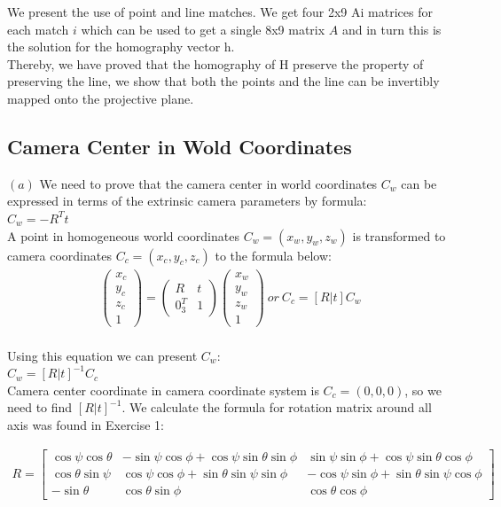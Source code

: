\documentclass[a4paper, twoside, english]{article}
\begin{document}
We present the use of point and line matches. We get four 2x9 Ai matrices for each match $i$ which can be used to get a single 8x9 matrix $A$ and in turn this is the solution for the homography vector h.\\
Thereby, we have proved that the homography of H preserve the property of preserving the line, we show that both the points and the line can be invertibly mapped onto the projective plane.

\subsection{ Camera Center in Wold Coordinates}
$(a)$ We need to prove that the camera center in world coordinates $C_w$ can be expressed in terms of the extrinsic camera parameters by formula:\\
$C_w = -R^Tt$\\
A point in homogeneous world coordinates $C_w=(x_w,y_w,z_w)$ is transformed to camera coordinates $C_c=(x_c,y_c,z_c)$ to the formula below:\\
\begin{equation}
	\begin{gathered}
	\left(
	\begin{array}{ccc}
		x_c\\
		y_c\\
		z_c\\
		1
	\end{array}
	\right) =
	\left(
	\begin{array}{ccc}
		R & t\\
		0_{3}^T & 1
	\end{array}
	\right)
	\left(
	\begin{array}{ccc}
		x_w\\
		y_w\\
		z_w\\
		1
	\end{array}
	\right) \
	or\  C_c = [R| t]C_w\\
	\label{eq:matrixCW}
	\end{gathered}
\end{equation}

Using this equation we can present $C_w$:\\
$ C_w = [R| t]^{-1}C_c$\\
Camera center coordinate in camera coordinate system is $C_c=(0,0,0)$, so we need to find $[R| t]^{-1}$.
We calculate the formula for rotation matrix around all axis was found in Exercise 1:

\begin{equation*}
\begin{gathered}
	R= \left[
	\begin{array}{ccc}
		\cos\psi\cos\theta & -\sin\psi\cos\phi+\cos\psi\sin\theta\sin\phi & \sin\psi\sin\phi+\cos\psi\sin\theta\cos\phi\\
		\cos\theta\sin\psi & \cos\psi\cos\phi+\sin\theta\sin\psi\sin\phi  & -\cos\psi\sin\phi+\sin\theta\sin\psi\cos\phi\\
		-\sin\theta & \cos\theta\sin\phi & \cos\theta\cos\phi
	\end{array}
	\right] 
\end{gathered}
\end{equation*}
\end{document}
